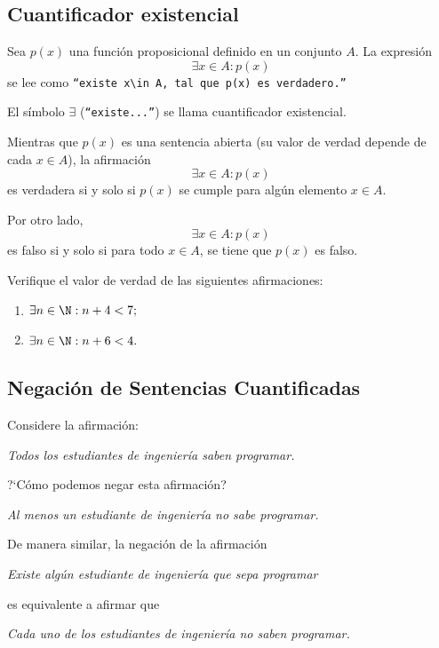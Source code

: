 \subsection{Cuantificador existencial}


 Sea $p(x)$ una función proposicional definido en un conjunto $A.$ La expresión
 \[
 \label{lip:4.3}
   \exists x \in A: p(x)
 \] 
 se lee como  \texttt{``existe $x\in A,$ tal que $p(x)$ es verdadero.''}  
 
 El símbolo $\exists$ (\texttt{``existe...''}) se llama cuantificador existencial.




 Mientras que $p(x)$ es una sentencia abierta (su valor de verdad depende de cada $x\in A$), la afirmación 
 $$\exists x\in A: p(x)$$ es verdadera si y solo si $p(x)$ se cumple para algún elemento $x\in A.$  



 Por otro lado,  $$\exists x\in A: p(x)$$ es falso si y solo si para todo $ x\in A $, se tiene que $ p(x) $ es falso.



 Verifique el valor de verdad de las siguientes afirmaciones:
 \begin{enumerate}
  \item $\exists n  \in \N: n+4<7;$ 
  \item $\exists n \in \N: n+6<4.$
 \end{enumerate}



\subsection{Negación de Sentencias Cuantificadas}



 Considere la afirmación:
 \begin{center}
  \emph{Todos los estudiantes de ingeniería saben programar.}
 \end{center}
?`Cómo podemos negar esta afirmación?


\begin{center}
 \emph{Al menos un estudiante de ingeniería no sabe programar.}
\end{center} 


 De manera similar, la negación de la afirmación
 \begin{center}
  \emph{Existe algún estudiante de ingeniería que sepa programar}
 \end{center}
 es equivalente a afirmar que 
 \begin{center}
  \emph{Cada uno de los estudiantes de ingeniería no saben programar.}
 \end{center}

